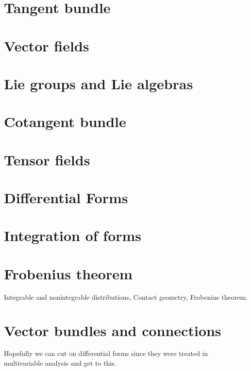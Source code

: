 \documentclass[nobib, a4paper]{tufte-book}
\theoremstyle{plain}
\theoremstyle{definition}
\theoremstyle{remark}
\begin{document}
\chapter{Tangent bundle}\label{ch:2}


\chapter{Vector fields}\label{ch:vf}


\chapter{Lie groups and Lie algebras}


\chapter{Cotangent bundle}\label{cg:ctb}


\chapter{Tensor fields}\label{cg:tf}


\chapter{Differential Forms}


\chapter{Integration of forms}


\begin{appendices}

  \chapter{Frobenius theorem}
  Integrable and nonintegrable distributions, Contact geometry, Frobenius theorem.

  \chapter{Vector bundles and connections}
  Hopefully we can cut on differential forms since they were treated in multivariable analysis and get to this.

\end{appendices}
\end{document}
